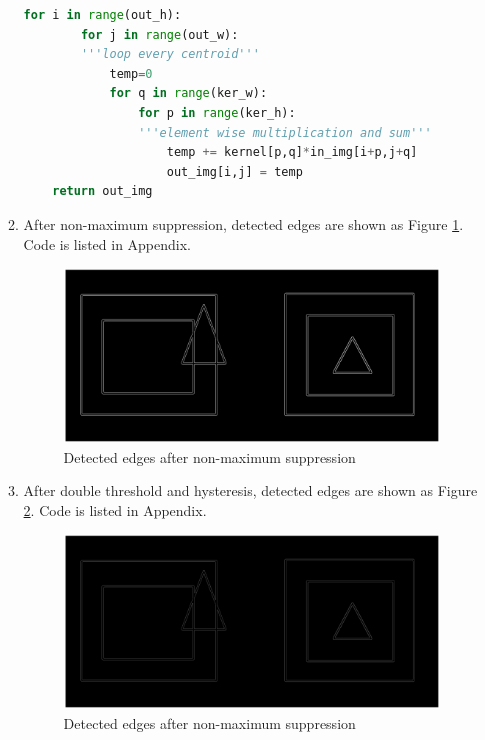 \documentclass[12pt]{article}
\begin{document}
\begin{enumerate}
\begin{enumerate}
\begin{lstlisting}[language=Python]
	for i in range(out_h):
		for j in range(out_w):
		'''loop every centroid'''
			temp=0
			for q in range(ker_w):
				for p in range(ker_h):
				'''element wise multiplication and sum'''
					temp += kernel[p,q]*in_img[i+p,j+q]
					out_img[i,j] = temp
	return out_img
\end{lstlisting}

\pagebreak
	\item After non-maximum suppression, detected edges are shown as Figure \ref{fig: q4b}. Code is listed in Appendix.
	\begin{figure}[H]
		\centering
		\includegraphics[width=\textwidth]{q4b.eps}
		\vspace{-4em}
		\caption{Detected edges after non-maximum suppression}\label{fig: q4b}
	\end{figure}	
	\item After double threshold and hysteresis, detected edges are shown as Figure \ref{fig: q4c}. Code is listed in Appendix.
	\begin{figure}[H]
		\centering
		\includegraphics[width=\textwidth]{q4c.eps}
		\vspace{-4em}
		\caption{Detected edges after non-maximum suppression}\label{fig: q4c}
	\end{figure}
\pagebreak


\end{enumerate}
\end{enumerate}
\end{document}
